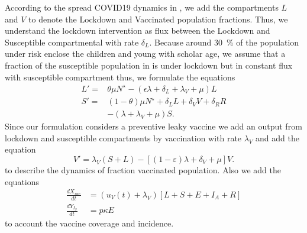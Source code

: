 According to the spread COVID19 dynamics in , we add
the compartments $L$ and $V$ to denote the Lockdown and Vaccinated population
fractions. Thus, we understand the lockdown intervention as flux between the
Lockdown and Susceptible compartmental with rate $\delta_L$. Because around
\SI{30}{\percent} of the population under risk enclose the children and
young  with scholar age, we assume that a fraction of the susceptible
population in  is under lockdown but in constant flux
with susceptible compartment thus, we formulate the  equations
\begin{equation*}
    \begin{aligned}
        L' =&  \theta \mu N^{\star}
            -(\epsilon \lambda + \delta_L + \lambda_V +\mu) L
        \\
        S' =&
            (1 - \theta) \mu N^\star
            + \delta_L L
            + \delta_V V
            + \delta_R R
        \\
        &-
            \left(
                \lambda + \lambda_V + \mu
            \right) S.
    \end{aligned}
\end{equation*}
%
Since our formulation considers a preventive leaky vaccine we add an output
from lockdown and susceptible compartments by vaccination with rate $\lambda_V$
and add the equation
$$
        V' = \lambda_V  (S + L)
    - \left[
        (1 - \varepsilon) \lambda
        + \delta_V
        + \mu
        \right ] V.
$$
to describe the dynamics of fraction vaccinated population.
Also we add the equations
\begin{equation*}
    \begin{aligned}
        \frac{dX_{vac}}{dt}
            &=
            (u_V(t) + \lambda_V)
            \left[
                L + S + E + I_A + R
            \right]
        \\
        \frac{d Y_{I_S}}{dt}
                & = p \kappa E
    \end{aligned}
\end{equation*}
to account the vaccine coverage and incidence.

